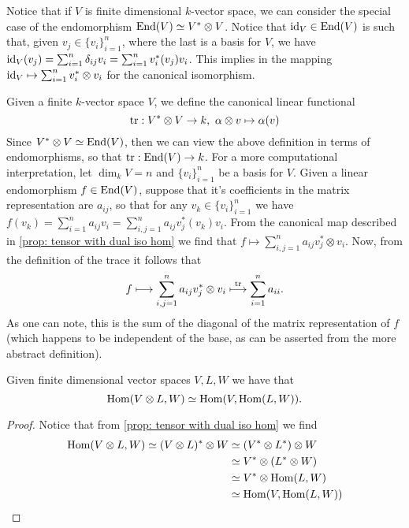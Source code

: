 Notice that if \(V\) is finite dimensional \(k\)-vector space, we can consider
the special case of the endomorphism \(\operatorname{End}(V) \simeq V^* \otimes V\). Notice
that \(\operatorname{id}_V \in \operatorname{End}(V)\) is such that, given \(v_j \in \{v_i\}_{i=1}^n\),
where the last is a basis for \(V\), we have \(\operatorname{id}_V(v_j) = \sum_{i=1}^n
\delta_{ij} v_i = \sum_{i=1}^n v_i^*(v_j) v_i\). This implies in the mapping
\(\operatorname{id}_V \mapsto \sum_{i=1}^n v_i^* \otimes v_i\) for the canonical isomorphism.

\begin{definition}[Trace]\label{def: trace}
  Given a finite \(k\)-vector space \(V\), we define the canonical linear
  functional
  \[
    \operatorname{tr}: V^* \otimes V \to k,\ \alpha \otimes v \mapsto
    \alpha(v)
  \]
  Since \(V^* \otimes V \simeq \operatorname{End}(V)\), then we can view the above definition in
  terms of endomorphisms, so that \(\operatorname{tr}: \operatorname{End}(V) \to k\). For a more
  computational interpretation, let \(\dim_k V = n\) and \(\{v_i\}_{i=1}^n\) be
  a basis for \(V\). Given a linear endomorphism \(f \in \operatorname{End}(V)\), suppose
  that it's coefficients in the matrix representation are \(a_{ij}\), so that
  for any \(v_k \in \{v_i\}_{i=1}^n\) we have \(f(v_k) = \sum_{i=1}^n a_{ij} v_i
  = \sum_{i,j=1}^n a_{ij} v_j^*(v_k) v_i\). From the canonical map described in
  \cref{prop: tensor with dual iso hom} we find that \(f \mapsto \sum_{i,j=1}^n
  a_{ij} v_j^* \otimes v_i\). Now, from the definition of the trace it follows
  that
  \[
    f \longmapsto \sum_{i,j=1}^n a_{ij} v_j^* \otimes v_i \overset{\operatorname{tr}}\longmapsto
    \sum_{i=1}^n a_{ii}.
  \]
  As one can note, this is the sum of the diagonal of the matrix representation
  of \(f\) (which happens to be independent of the base, as can be asserted from
  the more abstract definition).
\end{definition}

\begin{corollary}
  Given finite dimensional vector spaces \(V, L, W\) we have that
  \[
    \operatorname{Hom}(V \otimes L, W) \simeq \operatorname{Hom}(V, \operatorname{Hom}(L, W)).
  \]
\end{corollary}

\begin{proof}
  Notice that from \cref{prop: tensor with dual iso hom} we find
  \begin{align*}
    \operatorname{Hom}(V \otimes L, W) \simeq (V \otimes L)^* \otimes W
                         &\simeq (V^* \otimes L^*) \otimes W \\
                         &\simeq V^* \otimes (L^* \otimes W) \\
                         &\simeq V^* \otimes \operatorname{Hom}(L, W) \\
                         &\simeq \operatorname{Hom}(V, \operatorname{Hom}(L, W))
  \end{align*}
\end{proof}

